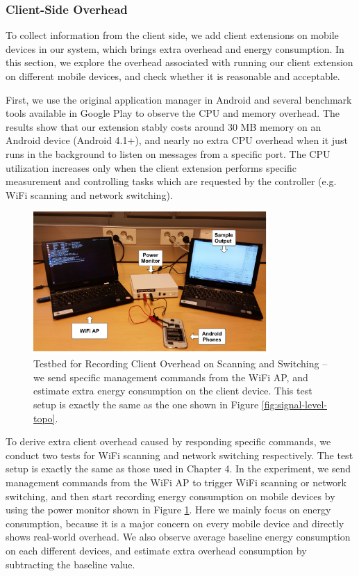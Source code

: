 \documentclass[english]{tktltiki}
\begin{document}
\subsubsection{Client-Side Overhead}

To collect information from the client side, we add client extensions on mobile devices in our system, which brings extra overhead and energy consumption. In this section, we explore the overhead associated with running our client extension on different mobile devices, and check whether it is reasonable and acceptable.

First, we use the original application manager in Android and several benchmark tools available in Google Play to observe the CPU and memory overhead. The results show that our extension stably costs around 30 MB memory on an Android device (Android 4.1+), and nearly no extra CPU overhead when it just runs in the background to listen on messages from a specific port. The CPU utilization increases only when the client extension performs specific measurement and controlling tasks which are requested by the controller (e.g. WiFi scanning and network switching). 

\begin{figure}[htbp]
  \centering
  \includegraphics[width=0.8\textwidth]{images/client-overhead.jpg}
  \caption{Testbed for Recording Client Overhead on Scanning and Switching -- we send specific management commands from the WiFi AP, and estimate extra energy consumption on the client device. This test setup is exactly the same as the one shown in Figure \ref{fig:signal-level-topo}.}
  \label{fig:client-overhead}
\end{figure}

To derive extra client overhead caused by responding specific commands, we conduct two tests for WiFi scanning and network switching respectively. The test setup is exactly the same as those used in Chapter 4. In the experiment, we send management commands from the WiFi AP to trigger WiFi scanning or network switching, and then start recording energy consumption on mobile devices by using the power monitor shown in Figure \ref{fig:client-overhead}. Here we mainly focus on energy consumption, because it is a major concern on every mobile device and directly shows real-world overhead. We also observe average baseline energy consumption on each different devices, and estimate extra overhead consumption by subtracting the baseline value.
\end{document}
